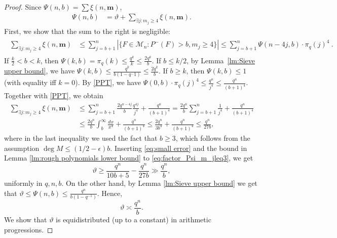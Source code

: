 \documentclass[12pt]{amsart}
\numberwithin{equation}{section}
\theoremstyle{definition}
\theoremstyle{remark}
\begin{document}
\begin{proof}
    Since $\Psi(n,b) = \sum \xi(n,\boldsymbol{m})$, 
    \begin{align}\label{eq:factor_Psi_m_jleq3}
        \Psi(n,b)   &= \vartheta+ \sum_{\exists j: m_j \geq 4} \xi(n,\boldsymbol{m}).
    \end{align}
    First, we show that the sum to the right is negligible:
    \begin{align*}
    \begin{split}
         \sum_{\exists j: m_j \geq 4} \xi(n,\boldsymbol{m}) &\leq
        \sum_{j=b+1}^n | \{F\in\mathcal{M}_n: P^-(F) > b, m_{j} \geq 4\}| \leq \sum_{j=b+1}^n \Psi(n-4j,b) \cdot \pi_q(j)^4\ .
    \end{split}
    \end{align*}
    If $\frac{k}{2}<b<k$, then $\Psi(k,b) = \pi_q(k) \leq \frac{q^k}{k} \leq \frac{2q^k}{b}$. If $b\leq k/2$, by Lemma~\ref{lm:Sieve upper bound}, we have $\Psi(k,b)\leq \frac{q^k}{b(1-q^-1)} \leq \frac{2q^k}{b}$. If $b\geq k$, then $\Psi(k,b)\leq 1$ (with equality iff $k=0$). By \eqref{PPT}, we have $\Psi(0,b)\cdot \pi_q(j)^4 \leq \frac{q^n}{j^4} \leq \frac{q^n}{(b+1)^4}$. Together with \eqref{PPT}, we obtain
    \begin{equation}\label{eq:small error}
    \begin{split}
        \sum_{\exists j: m_j \geq 4} \xi(n,\boldsymbol{m})  &\leq \sum_{j=b+1}^n \frac{2q^{n-4j}}{b} \frac{q^{4j}}{j^4} + \frac{q^n}{(b+1)^4} = \frac{2q^n}{b} \sum_{j=b+1}^n \frac{1}{j^4} + \frac{q^n}{(b+1)^4}  \\ 
        &\leq \frac{2q^n}{b} \int_b^\infty \frac{dx}{x^4} + \frac{q^n}{(b+1)^4} \leq \frac{2q^n}{3b^4} + \frac{q^n}{(b+1)^4} \leq \frac{q^n}{27b},
    \end{split}
    \end{equation}
    where in the last inequality we used the fact that $b \geq 3$, which follows from the assumption $\deg M \leq (1/2-\epsilon)b$. Inserting \eqref{eq:small error} and the bound in Lemma \ref{lm:rough polynomials lower bound} to \eqref{eq:factor_Psi_m_jleq3}, we get
    \[
        \vartheta \geq \frac{q^n}{10b+5} - \frac{q^n}{27b} \gg \frac{q^n}{b},
    \]
    uniformly in $q,n,b$.
    On the other hand, by Lemma \ref{lm:Sieve upper bound} we get that $\vartheta \leq \Psi(n,b) \leq \frac{q^n}{b(1-q^{-1})}$. Hence,
    \begin{equation}\label{eq:theta_asymp}
        \vartheta \asymp \frac{q^n}{b}.
    \end{equation}
    We show that $\vartheta$ is equidistributed (up to a constant) in arithmetic progressions.

\end{proof}
\end{document}
